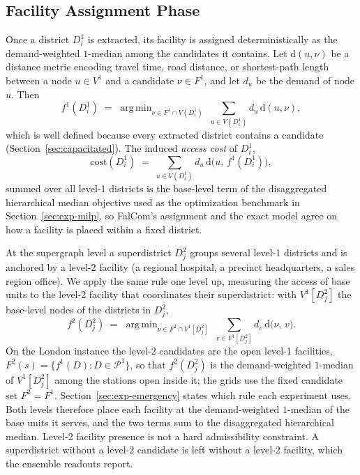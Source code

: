 \documentclass[preprint,12pt,authoryear]{elsarticle}
\theoremstyle{definition}
\begin{document}
\subsection{Facility Assignment Phase}
\label{sec:facility}
Once a district $D^1_i$ is extracted, its facility is assigned deterministically as the demand-weighted $1$-median among the candidates it contains. Let $\mathrm{d}(u, \nu)$ be a distance metric encoding travel time, road distance, or shortest-path length between a node $u \in V^1$ and a candidate $\nu \in F^1$, and let $d_u$ be the demand of node $u$. Then
\begin{equation}\label{eq:facility-assign}
    f^{1}(D^1_i) \;=\; \mathop{\mathrm{arg\,min}}_{\nu \in F^1 \cap V(D^1_i)} \; \sum_{u \in V(D^1_i)} d_u\, \mathrm{d}(u, \nu),
\end{equation}
which is well defined because every extracted district contains a candidate (Section~\ref{sec:capacitated}). The induced \emph{access cost} of $D^1_i$,
\begin{equation}\label{eq:demand-radius}
    \mathrm{cost}(D^1_i) \;=\; \sum_{u \in V(D^1_i)} d_u\, \mathrm{d}\bigl(u,\, f^{1}(D^1_i)\bigr),
\end{equation}
summed over all level-1 districts is the base-level term of the disaggregated hierarchical median objective used as the optimization benchmark in Section~\ref{sec:exp-milp}, so FalCom's assignment and the exact model agree on how a facility is placed within a fixed district.

At the supergraph level a superdistrict $D^2_j$ groups several level-1 districts and is anchored by a level-2 facility (a regional hospital, a precinct headquarters, a sales region office). We apply the same rule one level up, measuring the access of base units to the level-2 facility that coordinates their superdistrict: with $V^1[D^2_j]$ the base-level nodes of the districts in $D^2_j$,
\begin{equation}\label{eq:facility-assign-super}
    f^{2}(D^2_j) \;=\; \mathop{\mathrm{arg\,min}}_{\nu \in F^2 \cap V^1[D^2_j]} \; \sum_{v \in V^1[D^2_j]} d_v\, \mathrm{d}\bigl(\nu,\, v\bigr).
\end{equation}
On the London instance the level-2 candidates are the open level-1 facilities, $F^2(s) = \{f^1(D) : D \in \mathcal{P}^1\}$, so that $f^2(D^2_j)$ is the demand-weighted $1$-median of $V^1[D^2_j]$ among the stations open inside it; the grids use the fixed candidate set $F^2 = F^1$. Section~\ref{sec:exp-emergency} states which rule each experiment uses.
Both levels therefore place each facility at the demand-weighted $1$-median of the base units it serves, and the two terms sum to the disaggregated hierarchical median. Level-2 facility presence is not a hard admissibility constraint. A superdistrict without a level-2 candidate is left without a level-2 facility, which the ensemble readouts report.
\end{document}
